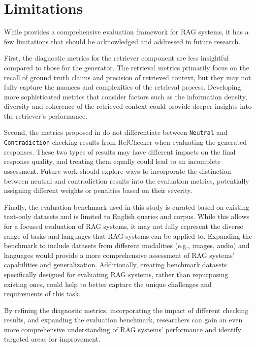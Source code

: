 \section{Limitations}
\label{appendix:limitations}

While \benchname\space provides a comprehensive evaluation framework for RAG systems, it has a few limitations that should be acknowledged and addressed in future research.

First, the diagnostic metrics for the retriever component are less insightful compared to those for the generator. The retrieval metrics primarily focus on the recall of ground truth claims and precision of retrieved context, but they may not fully capture the nuances and complexities of the retrieval process. Developing more sophisticated metrics that consider factors such as the information density, diversity and coherence of the retrieved context could provide deeper insights into the retriever's performance.


Second, the metrics proposed in \benchname\space do not differentiate between \texttt{Neutral} and \texttt{Contradiction} checking results from RefChecker when evaluating the generated responses. These two types of results may have different impacts on the final response quality, and treating them equally could lead to an incomplete assessment. Future work should explore ways to incorporate the distinction between neutral and contradiction results into the evaluation metrics, potentially assigning different weights or penalties based on their severity.

Finally, the evaluation benchmark used in this study is curated based on existing text-only datasets and is limited to English queries and corpus. While this allows for a focused evaluation of RAG systems, it may not fully represent the diverse range of tasks and languages that RAG systems can be applied to. Expanding the benchmark to include datasets from different modalities (e.g., images, audio) and languages would provide a more comprehensive assessment of RAG systems' capabilities and generalization. Additionally, creating benchmark datasets specifically designed for evaluating RAG systems, rather than repurposing existing ones, could help to better capture the unique challenges and requirements of this task.

By refining the diagnostic metrics, incorporating the impact of different checking results, and expanding the evaluation benchmark, researchers can gain an even more comprehensive understanding of RAG systems' performance and identify targeted areas for improvement.
